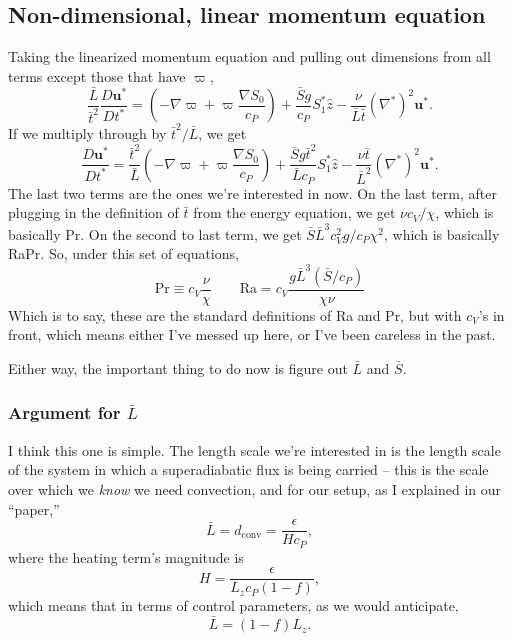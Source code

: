 \documentclass[aps, pre, onecolumn, nofootinbib, notitlepage, groupedaddress, amsfonts, amssymb, amsmath, longbibliography]{revtex4-1}
\newcommand{\grad}{\ensuremath{\nabla}}
\begin{document}
\subsection{Non-dimensional, linear momentum equation}
Taking the linearized momentum equation and pulling out dimensions from all terms except those that
have $\varpi$,
$$
\frac{\bar{L}}{\bar{t}^2}\frac{D \bm{u}^*}{D t^*} = \left(-\grad\varpi + \varpi\frac{\grad S_0}{c_P}\right)
+ \frac{\bar{S}g}{c_P} S_1^* \hat{z} - \frac{\nu}{\bar{L}\bar{t}}(\grad^*)^2\bm{u}^*.
$$
If we multiply through by $\bar{t}^2/\bar{L}$, we get
$$
\frac{D\bm{u}^*}{Dt^*} = \frac{\bar{t}^2}{\bar{L}}\left(-\grad\varpi + \varpi\frac{\grad S_0}{c_P}\right)
+ \frac{\bar{S} g \bar{t}^2}{\bar{L} c_P} S_1^* \hat{z} - \frac{\nu \bar{t}}{\bar{L}^2}(\grad^*)^2\bm{u}^*.
$$
The last two terms are the ones we're interested in now.  On the last term, after plugging in the
definition of $\bar{t}$ from the energy equation, we get $\nu c_V / \chi$, which is basically
Pr.  On the second to last term, we get $\bar{S} \bar{L}^3 c_V^2 g/ c_P \chi^2$, which is basically
RaPr.  So, under this set of equations,
\begin{equation}
\text{Pr} \equiv c_V \frac{\nu}{\chi} \qquad \text{Ra} = c_V\frac{g \bar{L}^3 (\bar{S}/c_P)}{\chi \nu}
\end{equation}
Which is to say, these are the standard definitions of Ra and Pr, but with $c_V$'s in front,
which means either I've messed up here, or I've been careless in the past.

Either way, the important thing to do now is figure out $\bar{L}$ and $\bar{S}$.

\subsubsection{Argument for $\bar{L}$}
I think this one is simple.  The length scale we're interested in is the length scale of the
system in which a superadiabatic flux is being carried -- this is the scale over which we 
\emph{know} we need convection, and for our setup, as I explained in our ``paper,''
$$
\bar{L} = d_{\text{conv}} = \frac{\epsilon}{H c_P},
$$
where the heating term's magnitude is
$$
H = \frac{\epsilon}{L_z c_P (1 - f)},
$$
which means that in terms of control parameters, as we would anticipate,
$$
\bar{L} = (1 - f) L_z.
$$
\end{document}

